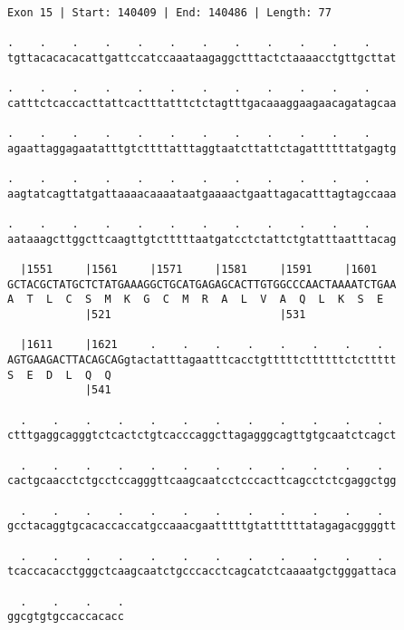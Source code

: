 \documentclass{article}
\begin{document}
\begin{Verbatim}[fontfamily=courier]
Exon 15 | Start: 140409 | End: 140486 | Length: 77

.    .    .    .    .    .    .    .    .    .    .    .    
tgttacacacacattgattccatccaaataagaggctttactctaaaacctgttgcttat

.    .    .    .    .    .    .    .    .    .    .    .    
catttctcaccacttattcactttatttctctagtttgacaaaggaagaacagatagcaa

.    .    .    .    .    .    .    .    .    .    .    .    
agaattaggagaatatttgtcttttatttaggtaatcttattctagattttttatgagtg

.    .    .    .    .    .    .    .    .    .    .    .    
aagtatcagttatgattaaaacaaaataatgaaaactgaattagacatttagtagccaaa

.    .    .    .    .    .    .    .    .    .    .    .    
aataaagcttggcttcaagttgtctttttaatgatcctctattctgtatttaatttacag

  |1551     |1561     |1571     |1581     |1591     |1601   
GCTACGCTATGCTCTATGAAAGGCTGCATGAGAGCACTTGTGGCCCAACTAAAATCTGAA
A  T  L  C  S  M  K  G  C  M  R  A  L  V  A  Q  L  K  S  E  
            |521                          |531              

  |1611     |1621     .    .    .    .    .    .    .    .  
AGTGAAGACTTACAGCAGgtactatttagaatttcacctgtttttcttttttctcttttt
S  E  D  L  Q  Q                                            
            |541                                            

  .    .    .    .    .    .    .    .    .    .    .    .  
ctttgaggcagggtctcactctgtcacccaggcttagagggcagttgtgcaatctcagct

  .    .    .    .    .    .    .    .    .    .    .    .  
cactgcaacctctgcctccagggttcaagcaatcctcccacttcagcctctcgaggctgg

  .    .    .    .    .    .    .    .    .    .    .    .  
gcctacaggtgcacaccaccatgccaaacgaatttttgtattttttatagagacggggtt

  .    .    .    .    .    .    .    .    .    .    .    .  
tcaccacacctgggctcaagcaatctgcccacctcagcatctcaaaatgctgggattaca

  .    .    .    .
ggcgtgtgccaccacacc
\end{Verbatim}
\newpage
\end{document}
